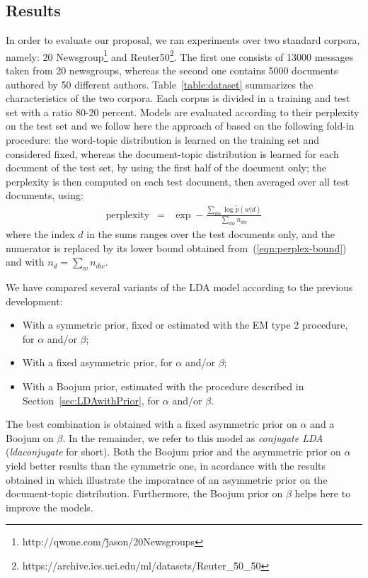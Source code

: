\subsection{Results} 
In order to evaluate our proposal, we ran experiments over two standard corpora, namely: 20 Newsgroup\footnote{http://qwone.com/\~jason/20Newsgroups} and Reuter50\footnote{https://archive.ics.uci.edu/ml/datasets/Reuter\_50\_50}. The first one consists of 13000 messages taken from 20 newsgroups, whereas the second one contains 5000 documents authored by 50 different authors. Table~\ref{table:dataset} summarizes the characteristics of the two corpora. Each corpus is divided in a training and test set with a ratio 80-20 percent. Models are evaluated according to their perplexity on the test set and we follow here the  approach of \cite{asuncion_smoothing_2009} based on the following fold-in procedure: the word-topic distribution is learned on the training set and considered fixed, whereas the document-topic distribution is learned for each document of the test set, by using the first half of the document only; the perplexity is then computed on each test document, then averaged over all test documents, using:
\begin{eqnarray*}
    \textrm{perplexity} & = & \exp-\frac{\sum_{dw}\log\tilde{p}(w|d)}{\sum_{dw}n_{dw}}
\end{eqnarray*}
where the index $d$ in the sums ranges over the test documents only, and the numerator is replaced by its lower bound obtained from~(\ref{eqn:perplex-bound}) and
with $n_d = \sum_w n_{dw}$.

We have compared several variants of the LDA model according to the previous development:
%
\begin{itemize}
\item With a symmetric prior, fixed or estimated with the EM type 2 procedure, for $\alpha$ and/or $\beta$;
\item With a fixed asymmetric prior, for $\alpha$ and/or $\beta$;
\item With a Boojum prior, estimated with the procedure described in Section~\ref{sec:LDAwithPrior}, for $\alpha$ and/or $\beta$.
\end{itemize}
%
The best combination is obtained with a fixed asymmetric prior on $\alpha$ and a Boojum on $\beta$. In the remainder, we refer to this model as {\it conjugate LDA} ({\it ldaconjugate} for short). Both the Boojum prior and the asymmetric prior on $\alpha$ yield better results than the symmetric one, in acordance with the results obtained in \cite{wallach_rethinking_2009} which illustrate the imporatnce of an asymmetric prior on the document-topic distribution. Furthermore, the Boojum prior on $\beta$ helps here to improve the models.

